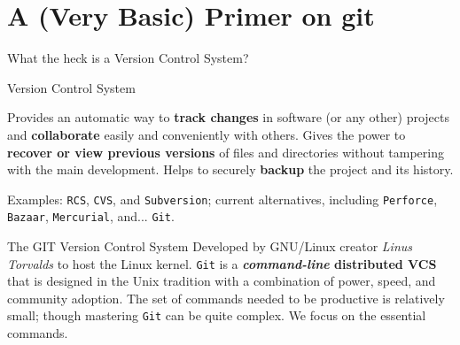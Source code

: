 \section{A (Very Basic) Primer on git}
\begin{frame}[t,fragile]{What the heck is a \alert{Version Control System}?}
  \begin{block}{Version Control System}
    {\footnotesize
      Provides an automatic way to \textbf{track changes} in software (or any other) projects and \textbf{collaborate} easily and conveniently with others. Gives the power to \textbf{recover or view previous versions} of files and directories without tampering with the main development. Helps to securely \textbf{backup} the project and its history.

      Examples: \texttt{RCS}, \texttt{CVS}, and \texttt{Subversion}; current alternatives, including \texttt{Perforce}, \texttt{Bazaar}, \texttt{Mercurial}, and... \texttt{Git}.}
  \end{block}

  \begin{block}{The GIT Version Control System}
    {\footnotesize
    Developed by GNU/Linux creator \emph{Linus Torvalds} to host the Linux kernel. \texttt{Git} is a \textbf{\emph{command-line} distributed VCS} that is designed in the Unix tradition with a combination of power, speed, and community adoption. The set of commands needed to be productive is relatively small; though mastering \texttt{Git} can be quite complex. We focus on the essential commands.
 }
  \end{block}
  
\end{frame}
